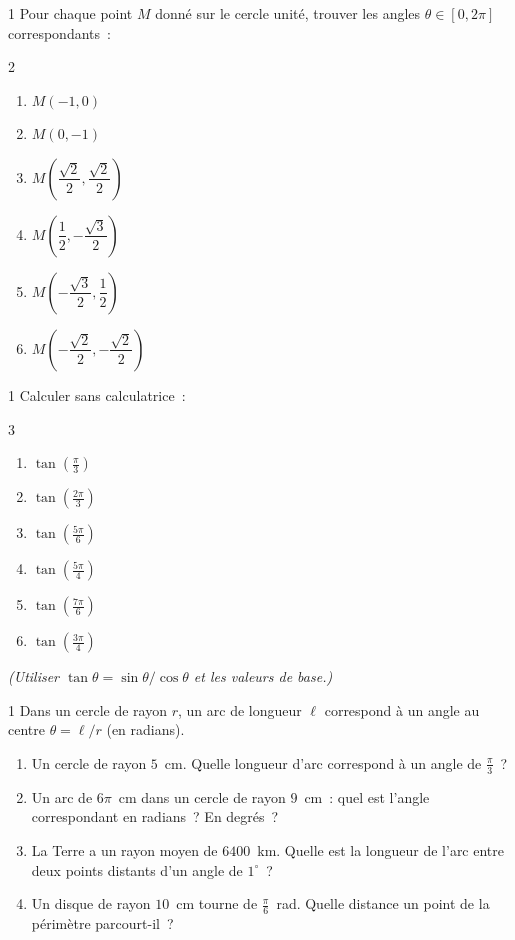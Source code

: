 \begin{exo}{1}
Pour chaque point $M$ donn\'e sur le cercle unit\'e, trouver les angles
$\theta\in[0,2\pi]$ correspondants~:
\begin{multicols}{2}
\begin{enumerate}
  \item $M(-1,0)$
  \item $M(0,-1)$
  \item $M\!\left(\dfrac{\sqrt{2}}{2},\dfrac{\sqrt{2}}{2}\right)$
  \item $M\!\left(\dfrac{1}{2},-\dfrac{\sqrt{3}}{2}\right)$
  \item $M\!\left(-\dfrac{\sqrt{3}}{2},\dfrac{1}{2}\right)$
  \item $M\!\left(-\dfrac{\sqrt{2}}{2},-\dfrac{\sqrt{2}}{2}\right)$
\end{enumerate}
\end{multicols}
\end{exo}

\begin{exo}{1}
Calculer sans calculatrice~:
\begin{multicols}{3}
\begin{enumerate}
  \item $\tan(\frac{\pi}{3})$
  \item $\tan(\frac{2\pi}{3})$
  \item $\tan(\frac{5\pi}{6})$
  \item $\tan(\frac{5\pi}{4})$
  \item $\tan(\frac{7\pi}{6})$
  \item $\tan(\frac{3\pi}{4})$
\end{enumerate}
\end{multicols}
\emph{(Utiliser $\tan\theta=\sin\theta/\cos\theta$ et les valeurs de base.)}
\end{exo}

\begin{exo}{1}
Dans un cercle de rayon $r$, un arc de longueur $\ell$ correspond
\`a un angle au centre $\theta = \ell/r$ (en radians).
\begin{enumerate}
  \item Un cercle de rayon $5$~cm. Quelle longueur d'arc correspond
        \`a un angle de $\frac{\pi}{3}$~?
  \item Un arc de $6\pi$~cm dans un cercle de rayon $9$~cm~:
        quel est l'angle correspondant en radians~? En degr\'es~?
  \item La Terre a un rayon moyen de $6400$~km. Quelle est la longueur
        de l'arc entre deux points distants d'un angle de $1^{\circ}$~?
  \item Un disque de rayon $10$~cm tourne de $\frac{\pi}{6}$~rad.
        Quelle distance un point de la p\'erim\`etre parcourt-il~?
\end{enumerate}
\end{exo}

